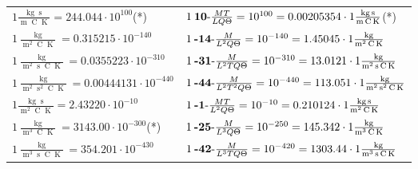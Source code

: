 \begin{center}
\begin{longtable}{l l}
{\color{black}$1 \bm{\mathrm{ }}\frac{\operatorname{kg}\operatorname{s}}{\operatorname{m}\operatorname{C}\operatorname{K}} = 244.044\cdot10^{100} $}\quad(*)&
	{\color{black}$1\:\text{\textbf{10}-} \frac{MT}{LQ\Theta}=10^{100} = 0.00205354 \cdot 1 \bm{\mathrm{ }}\frac{\operatorname{kg}\operatorname{s}}{\operatorname{m}\operatorname{C}\operatorname{K}}$}\quad(*)\\
{\color{black}$1 \bm{\mathrm{ }}\frac{\operatorname{kg}}{\operatorname{m}^2\operatorname{C}\operatorname{K}} = 0.315215\cdot10^{-140} $}&
	{\color{black}$1\:\text{\textbf{-14}-} \frac{M}{L^2Q\Theta}=10^{-140} = 1.45045 \cdot 1 \bm{\mathrm{ }}\frac{\operatorname{kg}}{\operatorname{m}^2\operatorname{C}\operatorname{K}}$}\\
{\color{black}$1 \bm{\mathrm{ }}\frac{\operatorname{kg}}{\operatorname{m}^2\operatorname{s}\operatorname{C}\operatorname{K}} = 0.0355223\cdot10^{-310} $}&
	{\color{black}$1\:\text{\textbf{-31}-} \frac{M}{L^2TQ\Theta}=10^{-310} = 13.0121 \cdot 1 \bm{\mathrm{ }}\frac{\operatorname{kg}}{\operatorname{m}^2\operatorname{s}\operatorname{C}\operatorname{K}}$}\\
{\color{black}$1 \bm{\mathrm{ }}\frac{\operatorname{kg}}{\operatorname{m}^2\operatorname{s}^2\operatorname{C}\operatorname{K}} = 0.00444131\cdot10^{-440} $}&
	{\color{black}$1\:\text{\textbf{-44}-} \frac{M}{L^2T^2Q\Theta}=10^{-440} = 113.051 \cdot 1 \bm{\mathrm{ }}\frac{\operatorname{kg}}{\operatorname{m}^2\operatorname{s}^2\operatorname{C}\operatorname{K}}$}\\
{\color{black}$1 \bm{\mathrm{ }}\frac{\operatorname{kg}\operatorname{s}}{\operatorname{m}^2\operatorname{C}\operatorname{K}} = 2.43220\cdot10^{-10} $}&
	{\color{black}$1\:\text{\textbf{-1}-} \frac{MT}{L^2Q\Theta}=10^{-10} = 0.210124 \cdot 1 \bm{\mathrm{ }}\frac{\operatorname{kg}\operatorname{s}}{\operatorname{m}^2\operatorname{C}\operatorname{K}}$}\\
{\color{black}$1 \bm{\mathrm{ }}\frac{\operatorname{kg}}{\operatorname{m}^3\operatorname{C}\operatorname{K}} = 3143.00\cdot10^{-300} $}\quad(*)&
	{\color{black}$1\:\text{\textbf{-25}-} \frac{M}{L^3Q\Theta}=10^{-250} = 145.342 \cdot 1 \bm{\mathrm{ }}\frac{\operatorname{kg}}{\operatorname{m}^3\operatorname{C}\operatorname{K}}$}\\
{\color{black}$1 \bm{\mathrm{ }}\frac{\operatorname{kg}}{\operatorname{m}^3\operatorname{s}\operatorname{C}\operatorname{K}} = 354.201\cdot10^{-430} $}&
	{\color{black}$1\:\text{\textbf{-42}-} \frac{M}{L^3TQ\Theta}=10^{-420} = 1303.44 \cdot 1 \bm{\mathrm{ }}\frac{\operatorname{kg}}{\operatorname{m}^3\operatorname{s}\operatorname{C}\operatorname{K}}$}\\

\end{longtable}
\end{center}
